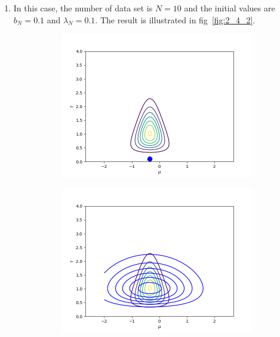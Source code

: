 \documentclass[11pt]{extarticle}
\newcommand{\0}{\mathbf{0}}
\renewcommand{\(}{\left(}
\renewcommand{\)}{\right)}
\theoremstyle{definition}
\begin{document}
\begin{enumerate}
	\item In this case, the number of data set is $N = 10$ and the initial values are $b_{N} = 0.1$ and $\lambda_{N} = 0.1$. The result is illustrated in fig~\ref{fig:2_4_2}.
	\begin{figure}[!ht]
		\centering
		\begin{subfigure}{.45\textwidth}
			\includegraphics[width=\linewidth]{2_4_2_1}
		\end{subfigure}
		\begin{subfigure}{.45\textwidth}
			\includegraphics[width=\linewidth]{2_4_2_2}
		\end{subfigure}
		\begin{subfigure}{.45\textwidth}

\end{subfigure}
\end{figure}
\end{enumerate}
\end{document}
